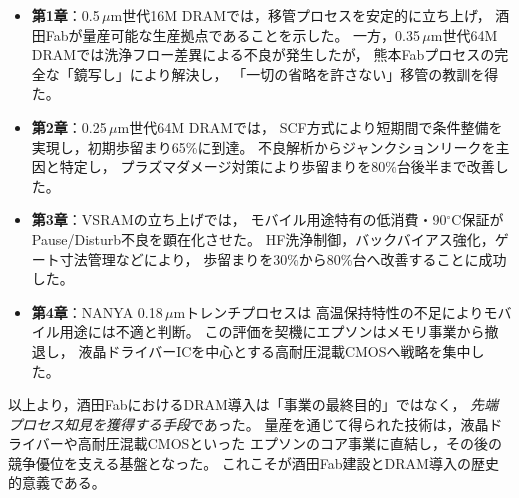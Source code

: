 \documentclass[conference]{IEEEtran}
\begin{document}
\begin{itemize}
  \item \textbf{第1章}：0.5\,$\mu$m世代16M DRAMでは，移管プロセスを安定的に立ち上げ，
        酒田Fabが量産可能な生産拠点であることを示した。
        一方，0.35\,$\mu$m世代64M DRAMでは洗浄フロー差異による不良が発生したが，
        熊本Fabプロセスの完全な「鏡写し」により解決し，
        「一切の省略を許さない」移管の教訓を得た。
  \item \textbf{第2章}：0.25\,$\mu$m世代64M DRAMでは，
        SCF方式により短期間で条件整備を実現し，初期歩留まり65\%に到達。
        不良解析からジャンクションリークを主因と特定し，
        プラズマダメージ対策により歩留まりを80\%台後半まで改善した。
  \item \textbf{第3章}：VSRAMの立ち上げでは，
        モバイル用途特有の低消費・90$^\circ$C保証が
        Pause/Disturb不良を顕在化させた。
        HF洗浄制御，バックバイアス強化，ゲート寸法管理などにより，
        歩留まりを30\%から80\%台へ改善することに成功した。
  \item \textbf{第4章}：NANYA 0.18\,$\mu$mトレンチプロセスは
        高温保持特性の不足によりモバイル用途には不適と判断。
        この評価を契機にエプソンはメモリ事業から撤退し，
        液晶ドライバーICを中心とする高耐圧混載CMOSへ戦略を集中した。
\end{itemize}

以上より，酒田FabにおけるDRAM導入は「事業の最終目的」ではなく，
\emph{先端プロセス知見を獲得する手段}であった。
量産を通じて得られた技術は，液晶ドライバーや高耐圧混載CMOSといった
エプソンのコア事業に直結し，その後の競争優位を支える基盤となった。
これこそが酒田Fab建設とDRAM導入の歴史的意義である。
\end{document}
